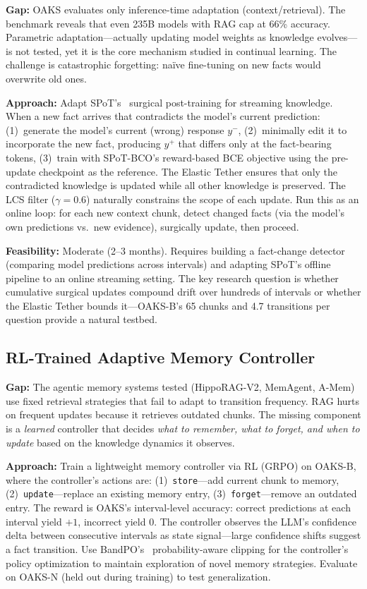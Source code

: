 \documentclass[11pt]{article}
\begin{document}
\textbf{Gap:} OAKS evaluates only inference-time adaptation (context/retrieval). The benchmark reveals that even 235B models with RAG cap at 66\% accuracy. Parametric adaptation---actually updating model weights as knowledge evolves---is not tested, yet it is the core mechanism studied in continual learning. The challenge is catastrophic forgetting: na\"ive fine-tuning on new facts would overwrite old ones.

\textbf{Approach:} Adapt SPoT's~\citep{lin2026spot} surgical post-training for streaming knowledge. When a new fact arrives that contradicts the model's current prediction: (1)~generate the model's current (wrong) response $y^-$, (2)~minimally edit it to incorporate the new fact, producing $y^+$ that differs only at the fact-bearing tokens, (3)~train with SPoT-BCO's reward-based BCE objective using the pre-update checkpoint as the reference. The Elastic Tether ensures that only the contradicted knowledge is updated while all other knowledge is preserved. The LCS filter ($\gamma{=}0.6$) naturally constrains the scope of each update. Run this as an online loop: for each new context chunk, detect changed facts (via the model's own predictions vs.\ new evidence), surgically update, then proceed.

\textbf{Feasibility:} Moderate (2--3 months). Requires building a fact-change detector (comparing model predictions across intervals) and adapting SPoT's offline pipeline to an online streaming setting. The key research question is whether cumulative surgical updates compound drift over hundreds of intervals or whether the Elastic Tether bounds it---OAKS-B's 65 chunks and 4.7 transitions per question provide a natural testbed.

\subsection{RL-Trained Adaptive Memory Controller}

\textbf{Gap:} The agentic memory systems tested (HippoRAG-V2, MemAgent, A-Mem) use fixed retrieval strategies that fail to adapt to transition frequency. RAG hurts on frequent updates because it retrieves outdated chunks. The missing component is a \emph{learned} controller that decides \emph{what to remember, what to forget, and when to update} based on the knowledge dynamics it observes.

\textbf{Approach:} Train a lightweight memory controller via RL (GRPO) on OAKS-B, where the controller's actions are: (1)~\texttt{store}---add current chunk to memory, (2)~\texttt{update}---replace an existing memory entry, (3)~\texttt{forget}---remove an outdated entry. The reward is OAKS's interval-level accuracy: correct predictions at each interval yield $+1$, incorrect yield $0$. The controller observes the LLM's confidence delta between consecutive intervals as state signal---large confidence shifts suggest a fact transition. Use BandPO's~\citep{li2026bandpo} probability-aware clipping for the controller's policy optimization to maintain exploration of novel memory strategies. Evaluate on OAKS-N (held out during training) to test generalization.
\end{document}
